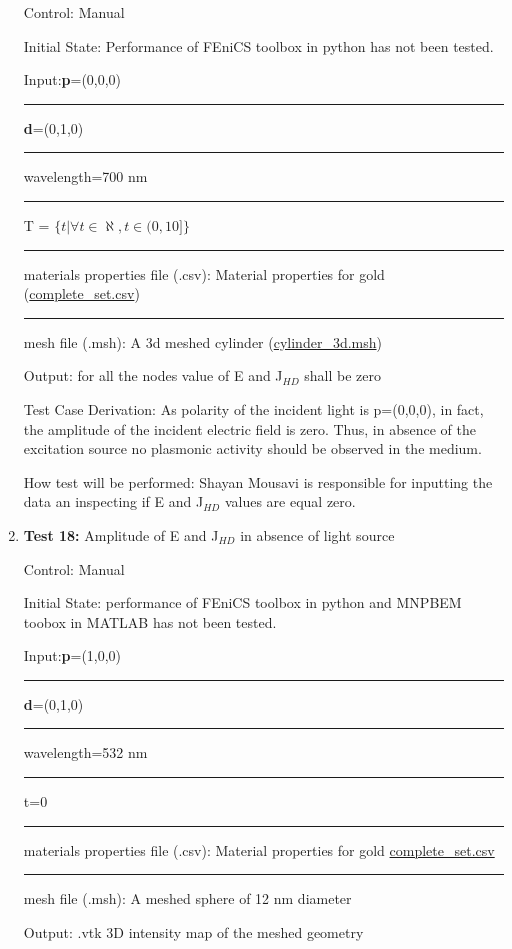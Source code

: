 \documentclass[12pt, titlepage]{article}
\begin{document}
\begin{enumerate}
Control: Manual 

Initial State: Performance of FEniCS toolbox in python has not been tested. 

Input:\textbf{p}=(0,0,0)\\
\rule{1.3cm}{0pt}\textbf{d}=(0,1,0)\\
\rule{1.3cm}{0pt}wavelength=700 nm\\ 
\rule{1.3cm}{0pt}T = $\{t| \forall t \in \aleph, t \in (0,10]\}$\\
\rule{1.3cm}{0pt}materials properties file (.csv): Material properties for gold (\href{https://github.com/shmouses/SPDFM/blob/master/src/TestCase/complete\_set.csv}{complete\_set.csv})\\
\rule{1.3cm}{0pt}mesh file (.msh): A 3d meshed cylinder (\href{https://github.com/shmouses/SPDFM/blob/master/src/TestCase/cylinder\_3d.msh}{cylinder\_3d.msh})

Output: for all the nodes value of E and J$_{HD}$ shall be zero 

Test Case Derivation: As polarity of the incident light is p=(0,0,0), in fact, the amplitude of the incident electric field is zero. Thus, in absence of the excitation source no plasmonic activity should be observed in the medium. 

How test will be performed: Shayan Mousavi is responsible for inputting the data an inspecting if E and J$_{HD}$ values are equal zero.  


\item{\textbf{Test 18:} Amplitude of E and J$_{HD}$ in absence of light source\\}

Control: Manual 

Initial State:  performance of FEniCS toolbox in python and MNPBEM toobox in MATLAB has not been tested. 

Input:\textbf{p}=(1,0,0)\\
\rule{1.1cm}{0pt}\textbf{d}=(0,1,0)\\
\rule{1.1cm}{0pt}wavelength=532 nm\\ 
\rule{1.1cm}{0pt}t=0\\
\rule{1.1cm}{0pt}materials properties file (.csv): Material properties for gold  \href{https://github.com/shmouses/SPDFM/blob/master/src/TestCase/complete\_set.csv}{complete\_set.csv}\\
\rule{1.1cm}{0pt}mesh file (.msh): A meshed sphere of 12 nm diameter

Output: .vtk 3D intensity map of the meshed geometry


\end{enumerate}
\end{document}
